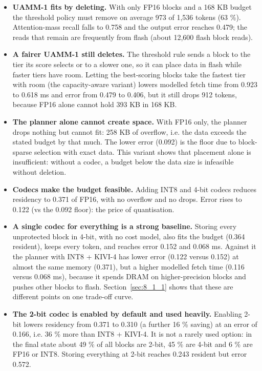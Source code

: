 \documentclass[12pt,a4paper]{report}
\begin{document}
\begin{itemize}
\item \textbf{UAMM-1 fits by deleting.} With only FP16 blocks and a 168 KB budget the threshold policy must remove on average 973 of 1,536 tokens (63 \%). Attention-mass recall falls to 0.758 and the output error reaches 0.479; the reads that remain are frequently from flash (about 12,600 flash block reads).
\item \textbf{A fairer UAMM-1 still deletes.} The threshold rule sends a block to the tier its score selects or to a slower one, so it can place data in flash while faster tiers have room. Letting the best-scoring blocks take the fastest tier with room (the capacity-aware variant) lowers modelled fetch time from 0.923 to 0.618 ms and error from 0.479 to 0.406, but it still drops 912 tokens, because FP16 alone cannot hold 393 KB in 168 KB.
\item \textbf{The planner alone cannot create space.} With FP16 only, the planner drops nothing but cannot fit: 258 KB of overflow, i.e. the data exceeds the stated budget by that much. The lower error (0.092) is the floor due to block-sparse selection with exact data. This variant shows that placement alone is insufficient: without a codec, a budget below the data size is infeasible without deletion.
\item \textbf{Codecs make the budget feasible.} Adding INT8 and 4-bit codecs reduces residency to 0.371 of FP16, with no overflow and no drops. Error rises to 0.122 (vs the 0.092 floor): the price of quantisation.
\item \textbf{A single codec for everything is a strong baseline.} Storing every unprotected block in 4-bit, with no cost model, also fits the budget (0.364 resident), keeps every token, and reaches error 0.152 and 0.068 ms. Against it the planner with INT8 + KIVI-4 has lower error (0.122 versus 0.152) at almost the same memory (0.371), but a higher modelled fetch time (0.116 versus 0.068 ms), because it spends DRAM on higher-precision blocks and pushes other blocks to flash. Section~\ref{sec:8_1_1} shows that these are different points on one trade-off curve.
\item \textbf{The 2-bit codec is enabled by default and used heavily.} Enabling 2-bit lowers residency from 0.371 to 0.310 (a further 16 \% saving) at an error of 0.166, i.e. 36 \% more than INT8 + KIVI-4. It is not a rarely used option: in the final state about 49 \% of all blocks are 2-bit, 45 \% are 4-bit and 6 \% are FP16 or INT8. Storing everything at 2-bit reaches 0.243 resident but error 0.572.

\end{itemize}
\end{document}
